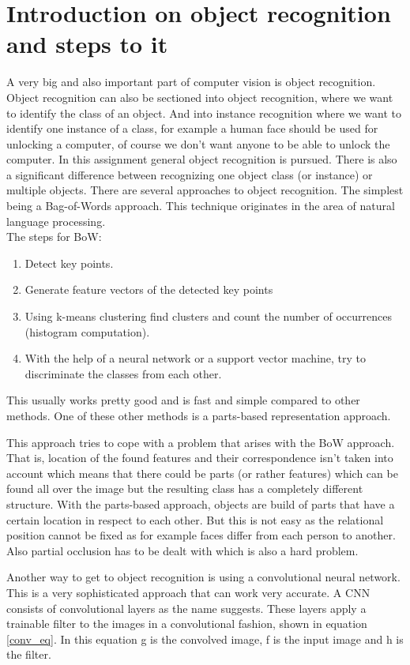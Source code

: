 \documentclass[UTF-8]{article}
\begin{document}
\section{Introduction on object recognition and steps to it}
A very big and also important part of computer vision is object recognition. Object recognition can also be sectioned into object recognition, where we want to identify the class of an object. And into instance recognition where we want to identify one instance of a class, for example a human face should be used for unlocking a computer, of course we don't want anyone to be able to unlock the computer. In this assignment general object recognition is pursued. There is also a significant difference between recognizing one object class (or instance) or multiple objects.
There are several approaches to object recognition. The simplest being a Bag-of-Words approach. This technique originates in the area of natural language processing.\\
The steps for BoW:\\
\begin{enumerate}
	\item Detect key points.
	\item Generate feature vectors of the detected key points
	\item Using k-means clustering find clusters and count the number of occurrences (histogram computation).
	\item With the help of a neural network or a support vector machine, try to discriminate the classes from each other.
\end{enumerate}

This usually works pretty good and is fast and simple compared to other methods.
One of these other methods is a parts-based representation approach.

This approach tries to cope with a problem that arises with the BoW approach. That is, location of the found features and their correspondence isn't taken into account which means that there could be parts (or rather features) which can be found all over the image but the resulting class has a completely different structure.
With the parts-based approach, objects are build of parts that have a certain location in respect to each other. But this is not easy as the relational position cannot be fixed as for example faces differ from each person to another. Also partial occlusion has to be dealt with which is also a hard problem.

Another way to get to object recognition is using a convolutional neural network. This is a very sophisticated approach that can work very accurate. A CNN consists of convolutional layers as the name suggests. These layers apply a trainable filter to the images in a convolutional fashion, shown in equation \ref{conv_eq}. In this equation g is the convolved image, f is the input image and h is the filter.
\end{document}

